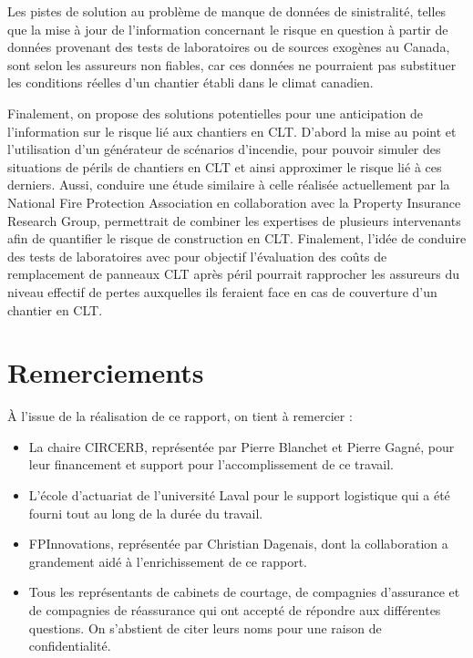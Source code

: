 \documentclass[11pt]{article}
\begin{document}
Les pistes de solution au problème de manque de données de sinistralité, telles que la mise à jour de l'information concernant le risque en question à partir de données provenant des tests de laboratoires ou de sources exogènes au Canada, sont selon les assureurs non fiables, car ces données ne pourraient pas substituer les conditions réelles d'un chantier établi dans le climat canadien.

Finalement, on propose des solutions potentielles pour une anticipation de l'information sur le risque lié aux chantiers en CLT. D'abord la mise au point et l'utilisation d'un générateur de scénarios d'incendie, pour pouvoir simuler des situations de périls de chantiers en CLT et ainsi approximer le risque lié à ces derniers. Aussi, conduire une étude similaire à celle réalisée actuellement par la National Fire Protection Association en collaboration avec la Property Insurance Research Group, permettrait de combiner les expertises de plusieurs intervenants afin de quantifier le risque de construction en CLT. Finalement, l'idée de conduire des tests de laboratoires avec pour objectif l'évaluation des coûts de remplacement de panneaux CLT après péril pourrait rapprocher les assureurs du niveau effectif de pertes auxquelles ils feraient face en cas de couverture d'un chantier en CLT.

\newpage
\section*{Remerciements}

À l'issue de la réalisation de ce rapport, on tient à remercier :

\begin{itemize}

\item[\textasteriskcentered] La chaire CIRCERB, représentée par Pierre Blanchet et Pierre Gagné, pour leur financement et support pour l'accomplissement de ce travail.

\item[\textasteriskcentered] L'école d'actuariat de l'université Laval pour le support logistique qui a été fourni tout au long de la durée du travail.

\item[\textasteriskcentered] FPInnovations, représentée par Christian Dagenais, dont la collaboration a grandement aidé à l'enrichissement de ce rapport.

\item[\textasteriskcentered] Tous les représentants de cabinets de courtage, de compagnies d'assurance et de compagnies de réassurance qui ont accepté de répondre aux différentes questions. On s'abstient de citer leurs noms pour une raison de confidentialité.

\end{itemize}
\newpage
\tableofcontents
\end{document}
